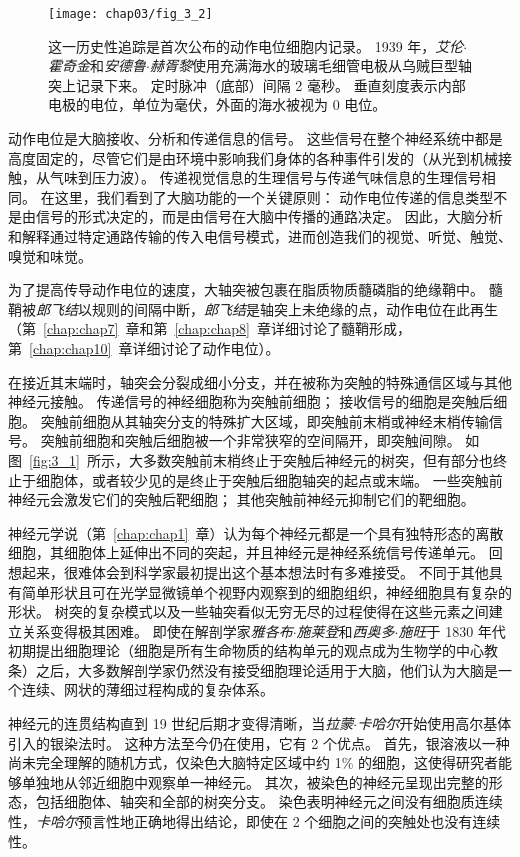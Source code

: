 \begin{figure}[htbp]
	\centering
	\texttt{[image: chap03/fig\_3\_2]}
	\caption{这一历史性追踪是首次公布的动作电位细胞内记录。 
		1939 年，\textit{艾伦$\cdot$霍奇金}和\textit{安德鲁$\cdot$赫胥黎}使用充满海水的玻璃毛细管电极从乌贼巨型轴突上记录下来。
		定时脉冲（底部）间隔 2 毫秒。 
		垂直刻度表示内部电极的电位，单位为毫伏，外面的海水被视为 0 电位\cite{hodgkin1939action}。}
	\label{fig:3_2}
\end{figure}


动作电位是大脑接收、分析和传递信息的信号。 
这些信号在整个神经系统中都是高度固定的，尽管它们是由环境中影响我们身体的各种事件引发的（从光到机械接触，从气味到压力波）。
传递视觉信息的生理信号与传递气味信息的生理信号相同。
在这里，我们看到了大脑功能的一个关键原则：
动作电位传递的信息类型不是由信号的形式决定的，而是由信号在大脑中传播的通路决定。
因此，大脑分析和解释通过特定通路传输的传入电信号模式，进而创造我们的视觉、听觉、触觉、嗅觉和味觉。


为了提高传导动作电位的速度，大轴突被包裹在脂质物质髓磷脂的绝缘鞘中。
髓鞘被\textit{郎飞结}以规则的间隔中断，\textit{郎飞结}是轴突上未绝缘的点，动作电位在此再生（第~\ref{chap:chap7}~章和第~\ref{chap:chap8}~章详细讨论了髓鞘形成，第~\ref{chap:chap10}~章详细讨论了动作电位）。


在接近其末端时，轴突会分裂成细小分支，并在被称为突触的特殊通信区域与其他神经元接触。
传递信号的神经细胞称为突触前细胞；
接收信号的细胞是突触后细胞。
突触前细胞从其轴突分支的特殊扩大区域，即突触前末梢或神经末梢传输信号。
突触前细胞和突触后细胞被一个非常狭窄的空间隔开，即突触间隙。
如图~\ref{fig:3_1}~所示，大多数突触前末梢终止于突触后神经元的树突，但有部分也终止于细胞体，或者较少见的是终止于突触后细胞轴突的起点或末端。
一些突触前神经元会激发它们的突触后靶细胞；
其他突触前神经元抑制它们的靶细胞。


神经元学说（第~\ref{chap:chap1}~章）认为每个神经元都是一个具有独特形态的离散细胞，其细胞体上延伸出不同的突起，并且神经元是神经系统信号传递单元。
回想起来，很难体会到科学家最初提出这个基本想法时有多难接受。
不同于其他具有简单形状且可在光学显微镜单个视野内观察到的细胞组织，神经细胞具有复杂的形状。
树突的复杂模式以及一些轴突看似无穷无尽的过程使得在这些元素之间建立关系变得极其困难。
即使在解剖学家\textit{雅各布$\cdot$施莱登}和\textit{西奥多$\cdot$施旺}于 1830 年代初期提出细胞理论（细胞是所有生命物质的结构单元的观点成为生物学的中心教条）之后，大多数解剖学家仍然没有接受细胞理论适用于大脑，他们认为大脑是一个连续、网状的薄细过程构成的复杂体系。


神经元的连贯结构直到 19 世纪后期才变得清晰，当\textit{拉蒙$\cdot$卡哈尔}开始使用高尔基体引入的银染法时。
这种方法至今仍在使用，它有 2 个优点。
首先，银溶液以一种尚未完全理解的随机方式，仅染色大脑特定区域中约 1\% 的细胞，这使得研究者能够单独地从邻近细胞中观察单一神经元。
其次，被染色的神经元呈现出完整的形态，包括细胞体、轴突和全部的树突分支。
染色表明神经元之间没有细胞质连续性，\textit{卡哈尔}预言性地正确地得出结论，即使在 2 个细胞之间的突触处也没有连续性。



